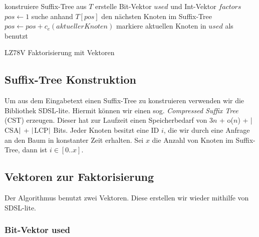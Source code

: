 \documentclass[a4paper,11pt]{scrartcl}%
\theoremstyle{change}
\theoremstyle{nonumberplain}
\theoremstyle{change}
\theoremstyle{nonumberplain}
\theoremstyle{change}
\theoremstyle{nonumberplain}
\begin{document}
\begin{algorithm}
	\SetAlgoLined
	\SetAlgoNoEnd%
	
	konstruiere Suffix-Tree aus $T$\;
	erstelle Bit-Vektor $used$ und Int-Vektor $factors$\;
	$pos \leftarrow 1$	
	 {
		suche anhand $T[pos]$ den nächsten Knoten im Suffix-Tree\;\label{line:child}
		 
		$pos \leftarrow pos + c_e(aktueller Knoten)$\;
		markiere aktuellen Knoten in $used$ als benutzt\;
	}
	
	\caption{LZ78V Faktorisierung mit Vektoren}
	\label{algo:factVec}
\end{algorithm}

\newpage

\subsection{Suffix-Tree Konstruktion}

Um aus dem Eingabetext einen Suffix-Tree zu konstruieren verwenden wir die Bibliothek SDSL-lite. Hiermit können wir einen sog. \textit{Compressed Suffix Tree} (CST) erzeugen. Dieser hat zur Laufzeit einen Speicherbedarf von 3$n$ + o($n$) + $\arrowvert$CSA$\arrowvert$ + $\arrowvert$LCP$\arrowvert$ Bits.\cite{sdsl} Jeder Knoten besitzt eine ID $i$, die wir durch eine Anfrage an den Baum in konstanter Zeit erhalten.
Sei $x$ die Anzahl von Knoten im Suffix-Tree, dann ist $i \in [0..x]$.


\subsection{Vektoren zur Faktorisierung}

Der Algorithmus benutzt zwei Vektoren. Diese erstellen wir wieder mithilfe von SDSL-lite.

\subsubsection{Bit-Vektor used}
\end{document}
